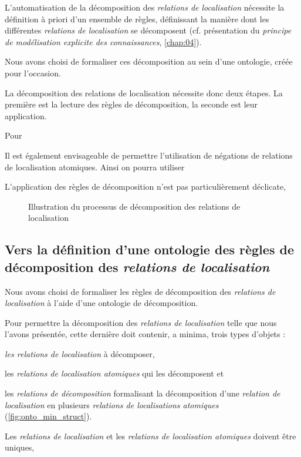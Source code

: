 L'automatisation de la décomposition des \emph{relations de
  localisation} nécessite la définition à priori d'un ensemble de
règles, définissant la manière dont les différentes \emph{relations de
  localisation} se décomposent (cf. présentation du \emph{principe de
  modélisation explicite des connaissances}, \autoref{chap:04}). 



Nous avons choisi de formaliser ces décomposition
au sein d'une ontologie, créée pour l'occasion.

La décomposition des relations de localisation nécessite donc deux
étapes. La première est la lecture des règles de décomposition, la
seconde est leur application.


Pour 







Il est également envisageable de permettre l'utilisation de négations
de relations de localisation atomiques. Ainsi on pourra utiliser




L'application des règles de décomposition n'est pas particulièrement
déclicate, 


\begin{figure}
  \centering
  \missingfigure{}
  \caption{Illustration du processus de décomposition des relations de
  localisation}
  \label{fig:logique_dec}
\end{figure}

\subsection{Vers la définition d'une ontologie des règles de
  décomposition des \emph{relations de localisation}}

Nous avons choisi de formaliser les règles de décomposition des
\emph{relations de localisation} à l'aide d'une ontologie de
décomposition.

Pour permettre la décomposition des \emph{relations de localisation}
telle que nous l'avons présentée, cette dernière doit contenir, a
minima, trois types d'objets :
%
\begin{enumerate*}[label=(\alph*)]
\item \emph{les relations de localisation} à décomposer,
\item les \emph{relations de localisation atomiques} qui les
  décomposent et
\item les \emph{relations de décomposition} formalisant la
  décomposition d'une \emph{relation de localisation} en plusieurs
  \emph{relations de localisations atomiques}
  (\autoref{fig:onto_min_struct}).
\end{enumerate*}
%
Les \emph{relations de localisation} et les \emph{relations de
  localisation atomiques} doivent être uniques, 

